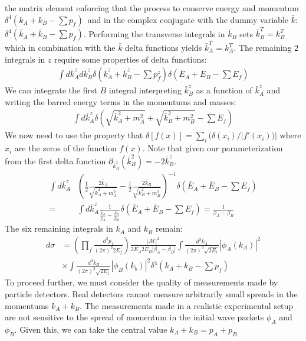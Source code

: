 the matrix element enforcing that the process to conserve energy and momentum
 $\delta^4(k_A +k_B - \sum p_f)$\ and in the complex conjugate with the dummy variable
 $\bar{k}$: $\delta^4(\bar{k}_A + \bar{k}_B - \sum p_f)$. Performing the transverse 
integrals in $\bar{k}_B$ sets $\bar{k}_B^T=k_B^T$ which in combination with the $\bar{k}$
delta functions yields $\bar{k}_A^T = k_A^T$. The remaining 2 integrals in $z$ require some properties of delta functions:
\begin{align*}
\int d \bar{k}_A^z d \bar{k}_B^z \delta( \bar{k}^z_A + \bar{k}^z_B  - \sum p_f^z) \delta (\bar{E}_A + \bar{E}_B - \sum E_f) 
\end{align*}
We can integrate the first $B$ integral interpreting $\bar{k}_B^z$ as a function of
$\bar{k}_A^z$ and writing the barred energy terms in the momentums and masses:
\begin{align*}
\int d\bar{k}_A^z  \delta \left (\sqrt{\bar{k}_A^2 +m_A^2}  + \sqrt{\bar{k}_B^2 + m_B^2} - \sum E_f \right) 
\end{align*}
We now need to use the property that $\delta[f(x)] = \sum_i (\delta(x_i) / |f'(x_i))|$ where $x_i$ are the zeros of the function $f(x)$. Note that given our parameterization from the first delta function $\partial_{\bar{k}_A^z}(\bar{k}_B^2) = - 2 \bar{k}_B^z$.
\begin{align*}
\int d\bar{k}_A^z & \left (\frac{1}{2} \frac{2\bar{k}_A}{\sqrt{\bar{k}_A^2 +m_A^2}}
 - \frac{1}{2} \frac{2\bar{k}_B}{\sqrt{\bar{k}_B^2 +m_B^2}} \right )^{-1}\delta(\bar{E}_A
 + \bar{E}_B - \sum E_f) \\
=& \int d\bar{k}_A^z \frac{1}{\frac{\bar{k}_A}{\bar{E}_A}- \frac{\bar{k}_B}{\bar{E}_B}}
 \delta(\bar{E}_A + \bar{E}_B - \sum E_f) = \frac{1}{\beta_A - \beta_B}
\end{align*}
The six remaining integrals in $k_A$ and $k_B$ remain:
\begin{align*}
d\sigma &= \left( \prod_f \frac{d^3p_f}{(2\pi)^3 2E_f} \right ) \frac{|\mathcal{M}|^2}{2E_A2E_B|\beta_A - \beta_B|}
 \int \frac{d^3 k_A }{(2\pi)^3 \sqrt{2E_i}} |\phi_A(k_A)|^2 \\ 
&\times  \int \frac{d^3 k_B }{(2\pi)^3 \sqrt{2E_i}} |\phi_B(k_b)|^2 \delta^4( k_A + k_B - \sum p_f)
\end{align*}
To proceed further, we must consider the quality of measurements made by particle detectors. 
Real detectors cannot measure arbitrarily small spreads in the momentums $k_A+k_B$. 
The measurements made in a realistic experimental setup are not sensitive to the
spread of momentum in the initial wave packets $\phi_A$ and $\phi_B$. Given this, we can take the central value $k_A+k_B=p_A+p_B$
